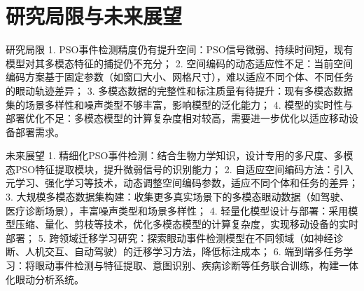 \documentclass{xdupgthesis}
\begin{document}
\section{研究局限与未来展望}

研究局限
1. PSO事件检测精度仍有提升空间：PSO信号微弱、持续时间短，现有模型对其多模态特征的捕捉仍不充分；
2. 空间编码的动态适应性不足：当前空间编码方案基于固定参数（如窗口大小、网格尺寸），难以适应不同个体、不同任务的眼动轨迹差异；
3. 多模态数据的完整性和标注质量有待提升：现有多模态数据集的场景多样性和噪声类型不够丰富，影响模型的泛化能力；
4. 模型的实时性与部署优化不足：多模态模型的计算复杂度相对较高，需要进一步优化以适应移动设备部署需求。

未来展望
1. 精细化PSO事件检测：结合生物力学知识，设计专用的多尺度、多模态PSO特征提取模块，提升微弱信号的识别能力；
2. 自适应空间编码方法：引入元学习、强化学习等技术，动态调整空间编码参数，适应不同个体和任务的差异；
3. 大规模多模态数据集构建：收集更多真实场景下的多模态眼动数据（如驾驶、医疗诊断场景），丰富噪声类型和场景多样性；
4. 轻量化模型设计与部署：采用模型压缩、量化、剪枝等技术，优化多模态模型的计算复杂度，实现移动设备的实时部署；
5. 跨领域迁移学习研究：探索眼动事件检测模型在不同领域（如神经诊断、人机交互、自动驾驶）的迁移学习方法，降低标注成本；
6. 端到端多任务学习：将眼动事件检测与特征提取、意图识别、疾病诊断等任务联合训练，构建一体化眼动分析系统。
\end{document}
